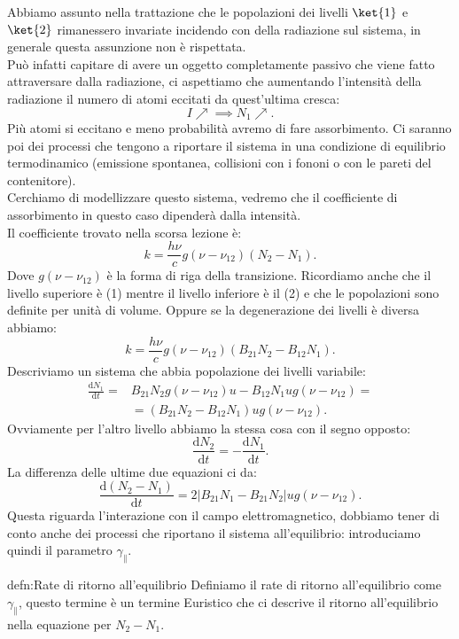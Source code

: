 Abbiamo assunto nella trattazione che le popolazioni dei livelli $\ket{1}$ e $\ket{2}$ rimanessero invariate incidendo con della radiazione sul sistema, in generale questa assunzione non è rispettata.\\ 
Può infatti capitare di avere un oggetto completamente passivo che viene fatto attraversare dalla radiazione, ci aspettiamo che aumentando l'intensità della radiazione il numero di atomi eccitati da quest'ultima cresca: 
\[
    I\nearrow\implies N_1\nearrow
.\] 
Più atomi si eccitano e meno probabilità avremo di fare assorbimento.
Ci saranno poi dei processi che tengono a riportare il sistema in una condizione di equilibrio termodinamico (emissione spontanea, collisioni con i fononi o con le pareti del contenitore).\\
Cerchiamo di modellizzare questo sistema, vedremo che il coefficiente di assorbimento in questo caso dipenderà dalla intensità.\\
Il coefficiente trovato nella scorsa lezione è:
\[
    k = \frac{h\nu}{c}g(\nu-\nu_{12}) \left(N_2-N_1\right)
.\] 
Dove $g(\nu-\nu_{12})$ è la forma di riga della transizione. Ricordiamo anche che il livello superiore è (1) mentre il livello inferiore è il (2) e che le popolazioni sono definite per unità di volume.
Oppure se la degenerazione dei livelli è diversa abbiamo:
\[
    k = \frac{h\nu}{c}g(\nu-\nu_{12}) \left(B_{21}N_2-B_{12}N_1\right)
.\] 
Descriviamo un sistema che abbia popolazione dei livelli variabile:
\[\begin{aligned}
    \frac{\text{d} N_1}{\text{d} t} =& B_{21}N_2g(\nu-\nu_{12}) u 
    -B_{12}N_1 u g(\nu-\nu_{12}) =\\
	&=\left(B_{21}N_2- B_{12}N_1\right)ug(\nu-\nu_{12}) 
.\end{aligned}\]
Ovviamente per l'altro livello abbiamo la stessa cosa con il segno opposto:
\[
    \frac{\text{d} N_2}{\text{d} t} = -\frac{\text{d} N_1}{\text{d} t}
.\] 
La differenza delle ultime due equazioni ci da:
\[
    \frac{\text{d} \left(N_2-N_1\right)}{\text{d} t} =
    2\left|B_{21}N_1-B_{21}N_2\right|u g(\nu-\nu_{12}) 
.\] 
Questa riguarda l'interazione con il campo elettromagnetico, dobbiamo tener di conto anche dei processi che riportano il sistema all'equilibrio: introduciamo quindi il parametro $\gamma_{\parallel}$.
\begin{defn}{defn:Rate di ritorno all'equilibrio}
Definiamo il rate di ritorno all'equilibrio come $\gamma_\parallel$, questo termine è un termine Euristico che ci descrive il ritorno all'equilibrio nella equazione per $N_2-N_1$. 
\end{defn}
